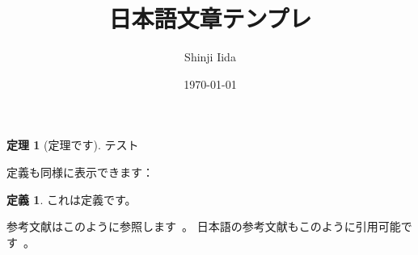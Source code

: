 \documentclass[12pt,dvipdfmx]{jlreq}
\title{日本語文章テンプレ}
\author{Shinji Iida}
\date{\today}
\theoremstyle{definition} %
\newtheorem{dfn}{定義}[section]
\newtheorem{thm}{定理}[section]
\begin{document}
\maketitle


\begin{thm}[定理です]
テスト
\end{thm}

 定義も同様に表示できます：
 \begin{dfn}
 これは定義です。
 \end{dfn}

 参考文献はこのように参照します~\cite{Iida2023-sl,Iida2022-qt,Iida2019-xh}。
 日本語の参考文献もこのように引用可能です~\cite{2023-xn}。


\end{document}
